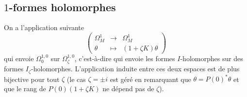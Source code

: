 \documentclass[12pt,draft]{article}
\begin{document}
\subsection{$1$-formes holomorphes}
\cite{Hitchin-Karlhede} On a l'application suivante
\begin{equation}
\begin{pmatrix}
\Omega^1_M & \longrightarrow & \Omega^1_M \\ 
\theta &  \mapsto &  (1 + \zeta K) \theta
\end{pmatrix} 
\end{equation}
qui envoie $\Omega^{1,0}_0$ sur $\Omega^{1,0}_\zeta$, c'est-à-dire qui envoie les formes $I$-holomorphes sur des formes $I_\zeta$-holomorphes. L'application induite entre ces deux espaces est de plus bijective pour tout $\zeta$ (le cas $\zeta = \pm i$ est géré en remarquant que $\theta = P(0)^*\theta$ et que le rang de $P(0)(1+\zeta  K)$ ne dépend pas de $\zeta$).

\appendix



\end{document}
